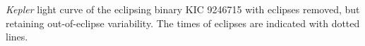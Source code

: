 \label{fig:lcfig2} \emph{Kepler} light curve of the eclipsing binary KIC 9246715 with eclipses removed, but retaining out-of-eclipse variability. The times of eclipses are indicated with dotted lines.